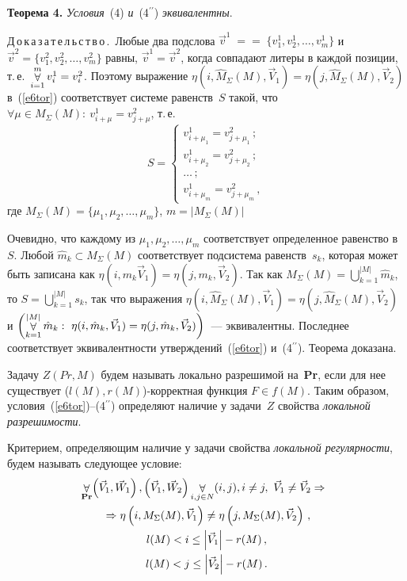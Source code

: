 \begin{multicols}{2}
\setcounter{equation}{4}\renewcommand{\theequation}{\arabic{equation}}

\noindent
\textbf{Теорема 4.} \textit{Условия}~(4) \textit{и}~(4$^{\prime\prime}$) \textit{эквивалентны}.

\medskip

\noindent
Д\,о\,к\,а\,з\,а\,т\,е\,л\,ь\,с\,т\,в\,о\,.\ Любые два подслова $\vec{v}^1\;=$\linebreak $=\;\{v_1^1, 
v_2^1,\ldots , v_m^1\}$ и $\vec{v}^2=\{v_1^2, v_2^2, \ldots , v_m^2\}$ равны, 
$\vec{v}^1=\vec{v}^2$, когда совпадают литеры в каждой позиции, т.\,е.\ 
$\mathop{\forall}\limits_{i=1}^m v_i^1=v_i^2$. Поэтому выражение $\eta (i, 
\hat{M}_\Sigma (M), \vec{V}_1)=\eta (j,\hat{M}_\Sigma(M),\vec{V}_2)$ 
в~(\ref{e6tor}) соответствует системе равенств~$S$ такой, что $\forall \mu \in 
M_\Sigma(M):\ v^1_{i+\mu}=v^2_{j+\mu}$, т.\,е.
$$
S = \begin{cases}
v^1_{i+\mu_1} = v^2_{j+\mu_1}\,;\\
v^1_{i+\mu_2} = v^2_{j+\mu_2}\,;\\
\ldots\,;\\
v^1_{i+\mu_m} = v^2_{j+\mu_m} \,,
\end{cases}
$$
где  $M_\Sigma(M)=\{\mu_1,\mu_2,\ldots , \mu_m\}$, $m=\left| M_\Sigma(M)\right |$

    Очевидно, что каждому из $\mu_1, \mu_2, \ldots , \mu_m$ соответствует 
определенное равенство в~$S$. Любой $\hat{m}_k \subset M_\Sigma(M)$ 
соответствует подсистема равенств~$s_k$, которая может быть записана как 
$\eta (i, m_k \vec{V}_1) =\eta(j,m_k,\vec{V}_2)$. Так как 
$M_\Sigma(M)=\bigcup\limits_{k=1}^{\vert M\vert} \hat{m}_k$, то 
$S=\bigcup\limits_{k=1}^{\vert M\vert} s_k$, так что выражения $\eta (i, 
\hat{M}_\Sigma(M), \vec{V}_1)=\eta(j,\hat{M}_\Sigma(M),\vec{V}_2)$ и $\left ( 
\mathop{\forall}\limits_{k=1}^{\vert M\vert } \hat{m}_k:\ \eta(i,\hat{m}_k, 
\vec{V}_1)=\eta(j,\hat{m}_k,\vec{V}_2)\right)$~--- эквивалентны. Последнее 
соответствует эквивалентности утверждений~(\ref{e6tor}) 
и~(4$^{\prime\prime}$). Теорема доказана.

\medskip

    Задачу $Z(Pr, M)$ будем  называть локально разрешимой на~\textbf{Pr}, 
если для нее существует ($l(M),r(M)$)-кор\-рект\-ная функция $F\in f(M)$. 
Таким образом, условия~(\ref{e6tor})--(4$^{\prime\prime}$) 
определяют наличие у задачи~$Z$ свойства \textit{локальной разрешимости}.

Критерием, определяющим наличие у задачи свойства \textit{локальной 
регулярности}, будем называть следующее условие:  
\begin{multline}
\!\!\forallb\limits_{\mathbf{Pr}} \!\left(\vec{V}_1,\vec{W}_1\right), 
\left(\vec{V}_1,\vec{W}_2\right) \forallb\limits_{i,j\in N}(i,j), i\not=j,\ 
\vec{V}_1\not=\vec{V}_2\Rightarrow {}\\
{}\Rightarrow \eta \left 
(i,M_\Sigma(M),\vec{V}_1\right)\not= \eta\left(j,M_\Sigma(M),\vec{V}_2\right)\,,\\
l(M)<i\leq \left | \vec{V}_1\right | -r(M)\,,\\
l(M)<j\leq \left |\vec{V}_2\right |-
r(M)\,.
\label{e7tor}
\end{multline}
        

\end{multicols}
